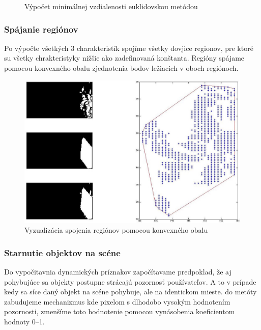 \begin{figure}[H]
  \begin{algorithm}[H]
   \caption{Výpočet minimálnej vzdialenosti euklidovskou metódou}
  \end{algorithm}
  \vspace{10mm}
\end{figure}

\subsubsection{Spájanie regiónov}
Po výpočte všetkých 3 charakteristík spojíme všetky dovjice regionov, pre ktoré su všetky chrakteristyky nižšie ako zadefinovaná konštanta.
Regióny spájame pomocou konvexného obalu zjednotenia bodov ležiacich v oboch regiónoch.
\begin{figure}[H]
  \centering
  \includegraphics[width=15cm]{pics/spojenie-regionov.jpg}
  \caption{Vyzualizácia spojenia regiónov pomocou konvexného obalu}
  \vspace{10mm}
\end{figure}

\subsubsection{Starnutie objektov na scéne}
Do vypočitavnia dynamických príznakov započítavame predpoklad, že aj pohybujúce sa objekty postupne strácajú pozornosť používateľov.
A to v prípade kedy sa síce daný objekt na scéne pohybuje, ale na identickom mieste.
do metóty zabudujeme mechanizmus kde pixelom s dlhodobo vysokým hodnotením pozornosti, zmenšíme toto hodnotenie pomocou  vynásobenia koeficientom hodnoty \numrange{0}{1}.

